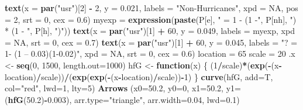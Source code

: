 \documentclass[12pt,oneside]{reedthesis}
\newenvironment{Shaded}{\begin{snugshade}}{\end{snugshade}}
\newcommand{\ControlFlowTok}[1]{\textcolor[rgb]{0.13,0.29,0.53}{\textbf{#1}}}
\newcommand{\DataTypeTok}[1]{\textcolor[rgb]{0.13,0.29,0.53}{#1}}
\newcommand{\DecValTok}[1]{\textcolor[rgb]{0.00,0.00,0.81}{#1}}
\newcommand{\FloatTok}[1]{\textcolor[rgb]{0.00,0.00,0.81}{#1}}
\newcommand{\KeywordTok}[1]{\textcolor[rgb]{0.13,0.29,0.53}{\textbf{#1}}}
\newcommand{\NormalTok}[1]{#1}
\newcommand{\OperatorTok}[1]{\textcolor[rgb]{0.81,0.36,0.00}{\textbf{#1}}}
\newcommand{\OtherTok}[1]{\textcolor[rgb]{0.56,0.35,0.01}{#1}}
\newcommand{\StringTok}[1]{\textcolor[rgb]{0.31,0.60,0.02}{#1}}
\begin{document}
\begin{Shaded}
\begin{Highlighting}[]
  \KeywordTok{text}\NormalTok{(}\DataTypeTok{x =} \KeywordTok{par}\NormalTok{(}\StringTok{"usr"}\NormalTok{)[}\DecValTok{2}\NormalTok{] }\OperatorTok{-}\StringTok{ }\DecValTok{2}\NormalTok{,  }\DataTypeTok{y =} \FloatTok{0.021}\NormalTok{, }\DataTypeTok{labels =} \StringTok{"Non-Hurricanes"}\NormalTok{, }\DataTypeTok{xpd =} \OtherTok{NA}\NormalTok{, }\DataTypeTok{pos =} \DecValTok{2}\NormalTok{, }\DataTypeTok{srt =} \DecValTok{0}\NormalTok{, }\DataTypeTok{cex =} \FloatTok{0.6}\NormalTok{)}
\NormalTok{  myexp =}\StringTok{ }\KeywordTok{expression}\NormalTok{(}\KeywordTok{paste}\NormalTok{(P[e], }\StringTok{" = 1 - (1 -"}\NormalTok{, P[nh], }\StringTok{") * (1 - "}\NormalTok{, P[h], }\StringTok{")"}\NormalTok{))}
  \KeywordTok{text}\NormalTok{(}\DataTypeTok{x =} \KeywordTok{par}\NormalTok{(}\StringTok{"usr"}\NormalTok{)[}\DecValTok{1}\NormalTok{] }\OperatorTok{+}\StringTok{ }\DecValTok{60}\NormalTok{,  }\DataTypeTok{y =} \FloatTok{0.049}\NormalTok{, }\DataTypeTok{labels =}\NormalTok{ myexp, }\DataTypeTok{xpd =} \OtherTok{NA}\NormalTok{, }\DataTypeTok{srt =} \DecValTok{0}\NormalTok{, }\DataTypeTok{cex =} \FloatTok{0.7}\NormalTok{)}
  \KeywordTok{text}\NormalTok{(}\DataTypeTok{x =} \KeywordTok{par}\NormalTok{(}\StringTok{"usr"}\NormalTok{)[}\DecValTok{1}\NormalTok{] }\OperatorTok{+}\StringTok{ }\DecValTok{60}\NormalTok{,  }\DataTypeTok{y =} \FloatTok{0.045}\NormalTok{, }\DataTypeTok{labels =} \StringTok{"? = 1- (1 – 0.03)(1-0.02)"}\NormalTok{, }\DataTypeTok{xpd =} \OtherTok{NA}\NormalTok{, }\DataTypeTok{srt =} \DecValTok{0}\NormalTok{, }\DataTypeTok{cex =} \FloatTok{0.6}\NormalTok{)}
\NormalTok{  location =}\StringTok{ }\DecValTok{65}
\NormalTok{  scale =}\StringTok{ }\DecValTok{20}
\NormalTok{  .x <-}\StringTok{ }\KeywordTok{seq}\NormalTok{(}\DecValTok{0}\NormalTok{, }\DecValTok{1500}\NormalTok{, }\DataTypeTok{length.out=}\DecValTok{1000}\NormalTok{)}
\NormalTok{  hfG <-}\StringTok{ }\ControlFlowTok{function}\NormalTok{(x) \{}
\NormalTok{    (}\DecValTok{1}\OperatorTok{/}\NormalTok{scale)}\OperatorTok{*}\NormalTok{(}\KeywordTok{exp}\NormalTok{(}\OperatorTok{-}\NormalTok{(x}\OperatorTok{-}\NormalTok{location)}\OperatorTok{/}\NormalTok{scale))}\OperatorTok{/}\NormalTok{(}\KeywordTok{exp}\NormalTok{(}\KeywordTok{exp}\NormalTok{(}\OperatorTok{-}\NormalTok{(x}\OperatorTok{-}\NormalTok{location)}\OperatorTok{/}\NormalTok{scale))}\OperatorTok{-}\DecValTok{1}\NormalTok{)}
\NormalTok{  \}}
  \KeywordTok{curve}\NormalTok{(hfG, }\DataTypeTok{add=}\NormalTok{T, }\DataTypeTok{col=}\StringTok{"red"}\NormalTok{, }\DataTypeTok{lwd=}\DecValTok{1}\NormalTok{, }\DataTypeTok{lty=}\DecValTok{5}\NormalTok{)}
  \KeywordTok{Arrows}\NormalTok{ (}\DataTypeTok{x0=}\FloatTok{50.2}\NormalTok{, }\DataTypeTok{y0=}\DecValTok{0}\NormalTok{, }\DataTypeTok{x1=}\FloatTok{50.2}\NormalTok{, }\DataTypeTok{y1=}\NormalTok{(}\KeywordTok{hfG}\NormalTok{(}\FloatTok{50.2}\NormalTok{)}\OperatorTok{-}\FloatTok{0.003}\NormalTok{), }\DataTypeTok{arr.type=}\StringTok{"triangle"}\NormalTok{, }\DataTypeTok{arr.width=}\FloatTok{0.04}\NormalTok{, }\DataTypeTok{lwd=}\FloatTok{0.1}\NormalTok{)}
  

\end{Highlighting}
\end{Shaded}
\end{document}
